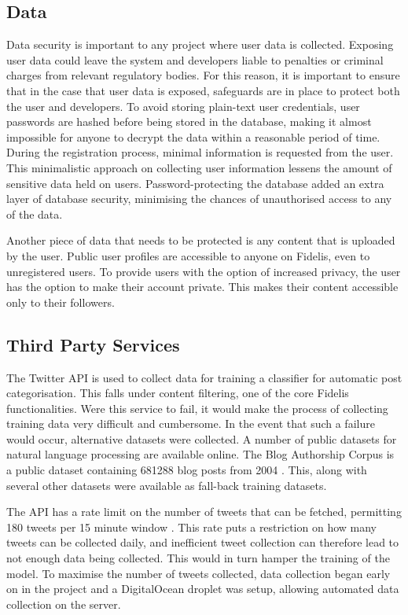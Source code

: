 \subsection{Data}
Data security is important to any project where user data is collected. Exposing user data could leave the system and developers liable to penalties or criminal charges from relevant regulatory bodies. For this reason, it is important to ensure that in the case that user data is exposed, safeguards are in place to protect both the user and developers. To avoid storing plain-text user credentials, user passwords are hashed before being stored in the database, making it almost impossible for anyone to decrypt the data within a reasonable period of time. During the registration process, minimal information is requested from the user. This minimalistic approach on collecting user information lessens the amount of sensitive data held on users. Password-protecting the database added an extra layer of database security, minimising the chances of unauthorised access to any of the data.

Another piece of data that needs to be protected is any content that is uploaded by the user. Public user profiles are accessible to anyone on Fidelis, even to unregistered users. To provide users with the option of increased privacy, the user has the option to make their account private. This makes their content accessible only to their followers.

\subsection{Third Party Services}
The Twitter API is used to collect data for training a classifier for automatic post categorisation. This falls under content filtering, one of the core Fidelis functionalities. Were this service to fail, it would make the process of collecting training data very difficult and cumbersome. In the event that such a failure would occur, alternative datasets were collected. A number of public datasets for natural language processing are available online. The Blog Authorship Corpus is a public dataset containing 681288 blog posts from 2004 \cite{dataset:blogs}. This, along with several other datasets \cite{dataset:all} were available as fall-back training datasets.

The API has a rate limit on the number of tweets that can be fetched, permitting 180 tweets per 15 minute window \cite{twitter-api:rates}. This rate puts a restriction on how many tweets can be collected daily, and inefficient tweet collection can therefore lead to not enough data being collected. This would in turn hamper the training of the model. To maximise the number of tweets collected, data collection began early on in the project and a DigitalOcean droplet was setup, allowing automated data collection on the server.
